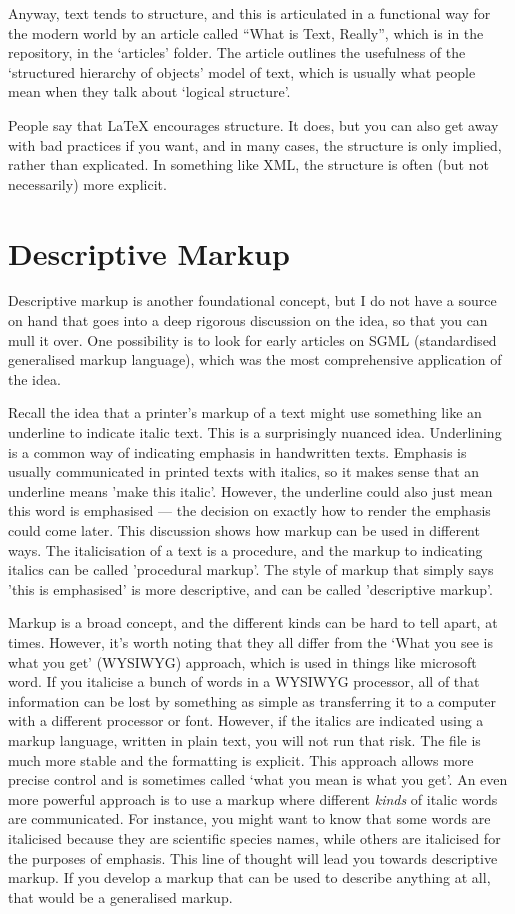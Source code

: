 \documentclass[11pt, oneside]{memoir}
\begin{document}
Anyway, text tends to structure, and this is articulated in a functional way for the modern world by an article called ``What is Text, Really'', which is in the repository, in the `articles' folder. The article outlines the usefulness of the `structured hierarchy of objects' model of text, which is usually what people mean when they talk about `logical structure'.

People say that \LaTeX{} encourages structure. It does, but you can also get away with bad practices if you want, and in many cases, the structure is only implied, rather than explicated. In something like XML, the structure is often (but not necessarily) more explicit.

\section{Descriptive Markup}
Descriptive markup is another foundational concept, but I do not have a source on hand that goes into a deep rigorous discussion on the idea, so that you can mull it over. One possibility is to look for early articles on SGML (standardised generalised markup language), which was the most comprehensive application of the idea.

Recall the idea that a printer's markup of a text might use something like an underline to indicate italic text. This is a surprisingly nuanced idea. Underlining is a common way of indicating emphasis in handwritten texts. Emphasis is usually communicated in printed texts with italics, so it makes sense that an underline means 'make this italic'. However, the underline could also just mean this word is emphasised — the decision on exactly how to render the emphasis could come later. This discussion shows how markup can be used in different ways. The italicisation of a text is a procedure, and the markup to indicating italics can be called 'procedural markup'. The style of markup that simply says 'this is emphasised' is more descriptive, and can be called 'descriptive markup'.

Markup is a broad concept, and the different kinds can be hard to tell apart, at times. However, it's worth noting that they all differ from the `What you see is what you get' (WYSIWYG) approach, which is used in things like microsoft word. If you italicise a bunch of words in a WYSIWYG processor, all of that information can be lost by something as simple as transferring it to a computer with a different processor or font. However, if the italics are indicated using a markup language, written in plain text, you will not run that risk. The file is much more stable and the formatting is explicit. This approach allows more precise control and is sometimes called `what you mean is what you get'. An even more powerful approach is to use a markup where different \emph{kinds} of italic words are communicated. For instance, you might want to know that some words are italicised because they are scientific species names, while others are italicised for the purposes of emphasis. This line of thought will lead you towards descriptive markup. If you develop a markup that can be used to describe anything at all, that would be a generalised markup.
\end{document}
